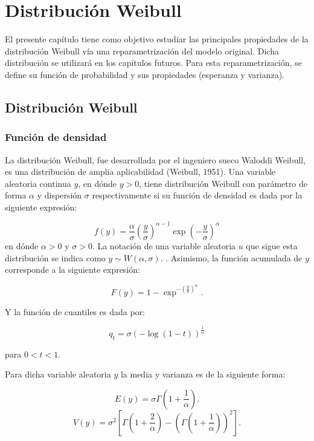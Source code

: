 \documentclass{report}
\begin{document}
\chapter{Distribución Weibull}

El presente capítulo tiene como objetivo estudiar las principales propiedades de la distribución Weibull vía una reparametrización del modelo original. Dicha distribución se utilizará en los capítulos futuros. Para esta reparametrización, se define su función de probabilidad y sus propiedades (esperanza y varianza).

\section{Distribución Weibull}

\subsection{Función de densidad}

La distribución Weibull, fue desarrollada por el ingeniero sueco Waloddi Weibull, es una distribución de amplia aplicabilidad (Weibull, 1951). Una variable aleatoria continua $y$, en dónde $y > 0$, tiene distribución Weibull con parámetro de forma $\alpha$ y dispersión $\sigma$ respectivamente si su función de densidad es dada por la siguiente expresión:

\begin{equation*}
f{(y)}= \frac{\alpha}{\sigma}\left(\frac{y}{\sigma}\right)^{\alpha-1} \exp{\left(-\frac{y}{\sigma}\right)^{\alpha}}
\end{equation*}
\noindent en dónde $\alpha > 0$ y $\sigma > 0$. La notación de una variable aleatoria $u$ que sigue esta distribución se indica como $y \sim W(\alpha,\sigma)$.
.
Asimismo, la función acumulada de $y$ corresponde a la siguiente expresión:

\[F{(y)}=1-\exp^{-{(\frac{y}{\sigma})}^{\alpha}}.\]

Y la función de cuantiles es dada por:

\[q_{t}=\sigma{(-\log{(1-t)})}^{\frac{1}{\alpha}}\]

\noindent para $0 < t < 1$.

Para dicha variable aleatoria $y$ la media y varianza es de la siguiente forma:

\[E(y)=\sigma \Gamma\left( 1+\frac{1}{\alpha} \right).\]
\[V(y)=\sigma^{2}\left[ \Gamma\left( 1+\frac{2}{\alpha} \right)-\left( \Gamma\left( 1+\frac{1}{\alpha} \right) \right)^{2} \right].\]
\end{document}
